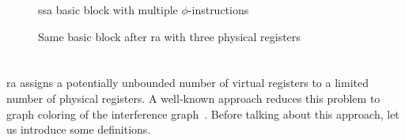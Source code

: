 \begin{figure}[ht]
\centering
\begin{minipage}{0.48\textwidth}
  \centering
  \caption{\gls{ssa} basic block with multiple $\phi$-instructions}
  \label{fig:par1}
\end{minipage}
\hfill
\begin{minipage}{0.48\textwidth}
  \centering
  \caption{Same basic block after \gls{ra} with three physical registers}
  \label{fig:par2}
\end{minipage}
\end{figure}

\section{}
\label{sec:ra}

\gls{ra} assigns a potentially unbounded number of virtual registers to a limited number of physical registers. A well-known approach reduces this problem to graph coloring of the interference graph~\cite{HGG:2006:RA_SSA}. Before talking about this approach, let us introduce some definitions.

